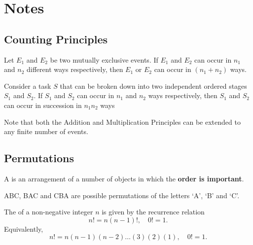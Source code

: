 \section{Notes}

\subsection{Counting Principles}

\begin{fact}
    Let $E_1$ and $E_2$ be two mutually exclusive events. If $E_1$ and $E_2$ can occur in $n_1$ and $n_2$ different ways respectively, then $E_1$ or $E_2$ can occur in $(n_1 + n_2)$ ways.
\end{fact}

\begin{fact}
    Consider a task $S$ that can be broken down into two independent ordered stages $S_1$ and $S_2$. If $S_1$ and $S_2$ can occur in $n_1$ and $n_2$ ways respectively, then $S_1$ and $S_2$ can occur in succession in $n_1 n_2$ ways
\end{fact}

Note that both the Addition and Multiplication Principles can be extended to any finite number of events.

\subsection{Permutations}

\begin{definition}
    A  is an arrangement of a number of objects in which the \textbf{order is important}.
\end{definition}

\begin{example}
    ABC, BAC and CBA are possible permutations of the letters `A', `B' and `C'.
\end{example}

\begin{definition}[Factorial]
    The  of a non-negative integer $n$ is given by the recurrence relation \[n! = n(n-1)!, \quad 0! = 1.\] Equivalently, \[n! = n(n-1)(n-2)\dots(3)(2)(1), \quad 0! = 1.\]
\end{definition}

